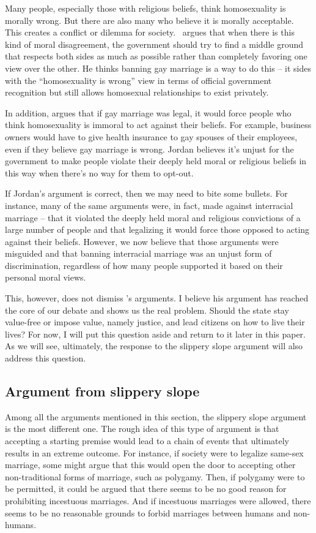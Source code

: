 \documentclass[man,floatsintext]{apa7}
\begin{document}
Many people, especially those with religious beliefs, think homosexuality is morally wrong. But there are also many who believe it is morally acceptable. This creates a conflict or dilemma for society.~\textcite{jordanItWrongDiscriminate1995} argues that when there is this kind of moral disagreement, the government should try to find a middle ground that respects both sides as much as possible rather than completely favoring one view over the other. He thinks banning gay marriage is a way to do this -- it sides with the ``homosexuality is wrong'' view in terms of official government recognition but still allows homosexual relationships to exist privately. 

In addition,  argues that if gay marriage was legal, it would force people who think homosexuality is immoral to act against their beliefs. For example, business owners would have to give health insurance to gay spouses of their employees, even if they believe gay marriage is wrong. Jordan believes it's unjust for the government to make people violate their deeply held moral or religious beliefs in this way when there's no way for them to opt-out. 

If Jordan's argument is correct, then we may need to bite some bullets. For instance, many of the same arguments were, in fact, made against interracial marriage -- that it violated the deeply held moral and religious convictions of a large number of people and that legalizing it would force those opposed to acting against their beliefs. However, we now believe that those arguments were misguided and that banning interracial marriage was an unjust form of discrimination, regardless of how many people supported it based on their personal moral views. 

This, however, does not dismiss 's arguments. I believe his argument has reached the core of our debate and shows us the real problem. Should the state stay value-free or impose value, namely justice, and lead citizens on how to live their lives? For now, I will put this question aside and return to it later in this paper. As we will see, ultimately, the response to the slippery slope argument will also address this question.


\subsection{Argument from slippery slope}

Among all the arguments mentioned in this section, the slippery slope argument is the most different one. The rough idea of this type of argument is that accepting a starting premise would lead to a chain of events that ultimately results in an extreme outcome. For instance, if society were to legalize same-sex marriage, some might argue that this would open the door to accepting other non-traditional forms of marriage, such as polygamy. Then, if polygamy were to be permitted, it could be argued that there seems to be no good reason for prohibiting incestuous marriages. And if incestuous marriages were allowed, there seems to be no reasonable grounds to forbid marriages between humans and non-humans. 
\end{document}
